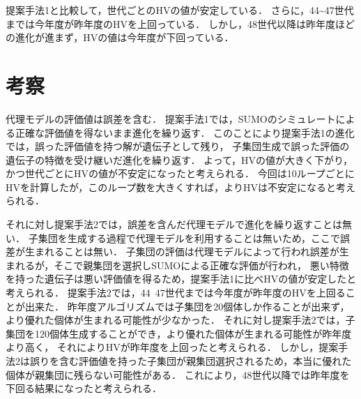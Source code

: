 \documentclass[main]{subfiles}
\begin{document}
        提案手法1と比較して，世代ごとのHVの値が安定している．
        さらに，44\textasciitilde47世代までは今年度が昨年度のHVを上回っている．
        しかし，48世代以降は昨年度ほどの進化が進まず，HVの値は今年度が下回っている．

    \section{考察}
    代理モデルの評価値は誤差を含む．
    提案手法1では，SUMOのシミュレートによる正確な評価値を得ないまま進化を繰り返す．
    このことにより提案手法1の進化では，誤った評価値を持つ解が遺伝子として残り，
    子集団生成で誤った評価の遺伝子の特徴を受け継いだ進化を繰り返す．
    よって，HVの値が大きく下がり，かつ世代ごとにHVの値が不安定になったと考えられる．
    今回は10ループごとにHVを計算したが，このループ数を大きくすれば，よりHVは不安定になると考えられる．

    それに対し提案手法2では，誤差を含んだ代理モデルで進化を繰り返すことは無い．
    子集団を生成する過程で代理モデルを利用することは無いため，ここで誤差が生まれることは無い．
    子集団の評価は代理モデルによって行われ誤差が生まれるが，そこで親集団を選択しSUMOによる正確な評価が行われ，
    悪い特徴を持った遺伝子は悪い評価値を得るため，提案手法1に比べHVの値が安定したと考えられる．
    提案手法2では，44~47世代までは今年度が昨年度のHVを上回ることが出来た．
    昨年度アルゴリズムでは子集団を20個体しか作ることが出来ず，より優れた個体が生まれる可能性が少なかった．
    それに対し提案手法2では，子集団を120個体生成することができ，より優れた個体が生まれる可能性が昨年度より高く，
    それによりHVが昨年度を上回ったと考えられる．
    しかし，提案手法2は誤りを含む評価値を持った子集団が親集団選択されるため，本当に優れた個体が親集団に残らない可能性がある．
    これにより，48世代以降では昨年度を下回る結果になったと考えられる．



    
\end{document}

